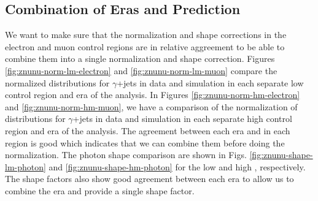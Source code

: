
\subsection{Combination of Eras and Prediction}\label{subsec:znunucombine}

We want to make sure that the normalization and shape corrections in the electron and muon control regions are in relative aggreement to be able to combine them into a single normalization and shape correction. Figures \ref{fig:znunu-norm-lm-electron} and \ref{fig:znunu-norm-lm-muon} compare the normalized \metgamma{} distributions for $\gamma$+jets in data and simulation in each separate low \dm{} control region and era of the analysis. In Figures \ref{fig:znunu-norm-hm-electron} and \ref{fig:znunu-norm-hm-muon}, we have a comparison of the normalization of \metgamma{} distributions for $\gamma$+jets in data and simulation in each separate high \dm{} control region and era of the analysis. The agreement between each era and in each region is good which indicates that we can combine them before doing the normalization. The photon shape comparison are shown in Figs. \ref{fig:znunu-shape-lm-photon} and \ref{fig:znunu-shape-hm-photon} for the low and high \dm{}, respectively. The shape factors also show good agreement between each era to allow us to combine the era and provide a single shape factor. 


